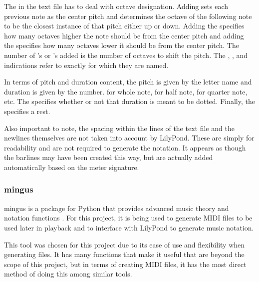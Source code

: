 The  in the text file has to deal with octave designation.  Adding  sets each previous note as the center pitch and determines the octave of the following note to be the closest instance of that pitch either up or down.  Adding the \code{\textquotesingle} specifies how many octaves higher the note should be from the center pitch and adding the \code{,} specifies how many octaves lower it should be from the center pitch.  The number of \code{\textquotesingle}'s or \code{,}'s added is the number of octaves to shift the pitch.  The , , and  indications refer to exactly for which they are named.

\vspace{\baselineskip}

In terms of pitch and duration content, the pitch is given by the letter name and duration is given by the number.   for whole note,  for half note,  for quarter note, etc.  The  specifies whether or not that duration is meant to be dotted.  Finally, the  specifies a rest.

\vspace{\baselineskip}

Also important to note, the spacing within the lines of the text file and the newlines themselves are not taken into account by LilyPond.  These are simply for readability and are not required to generate the notation.  It appears as though the barlines may have been created this way, but are actually added automatically based on the meter signature.

\subsubsection{mingus}
\label{subsubsec:mingus}

mingus is a package for Python that provides advanced music theory and notation functions \cite{Spaans_2015}.  For this project, it is being used to generate MIDI files to be used later in playback and to interface with LilyPond to generate music notation.

\vspace{\baselineskip}

This tool was chosen for this project due to its ease of use and flexibility when generating files.  It has many functions that make it useful that are beyond the scope of this project, but in terms of creating MIDI files, it has the most direct method of doing this among similar tools.

